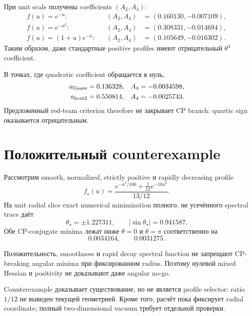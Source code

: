 При unit scale получены coefficients $(A_2,A_4)$:
\begin{align}
 f(u)=e^{-u}:&& (A_2,A_4)&=(0.160130,-0.007109),\\
 f(u)=e^{-u^2}:&& (A_2,A_4)&=(0.308331,-0.014694),\\
 f(u)=(1+u)e^{-u}:&& (A_2,A_4)&=(0.105649,-0.016302).
\end{align}
Таким образом, даже стандартные positive profiles имеют отрицательный
$\theta^4$ coefficient.

В точках, где quadratic coefficient обращается в нуль,
\begin{align}
 a_{\rm Gauss}&=0.136328,
 &A_4&=-0.0034598,\\
 a_{\rm heat2}&=0.550814,
 &A_4&=-0.0025743.
\end{align}
Предложенный red-team criterion therefore не закрывает CP branch: quartic
sign оказывается отрицательным.

\section{Положительный counterexample}

Рассмотрим smooth, normalized, strictly positive и rapidly decreasing profile
\begin{equation}
 f_\star(u)
 =\frac{e^{-u^2/100}+\frac1{12}e^{-10u^2}}{13/12}.
\end{equation}
На unit radial slice exact numerical minimization полного, не усечённого
spectral trace даёт
\begin{equation}
 \theta_\star=\pm1.227311,
 \qquad
 |\sin\theta_\star|=0.941587.
\end{equation}
Обе CP-conjugate minima лежат ниже $\theta=0$ и $\theta=\pi$ соответственно
на
\begin{equation}
 0.0034164,\qquad0.0031275.
\end{equation}

\begin{theorem}
Положительность, smoothness и rapid decay spectral function не запрещают
CP-breaking angular minima при фиксированном radius. Поэтому нулевой mixed
Hessian и positivity не доказывают даже angular no-go.
\end{theorem}

Counterexample доказывает существование, но не является profile selector:
ratio $1/12$ не выведен текущей геометрией. Кроме того, расчёт пока фиксирует
radial coordinate; полный two-dimensional vacuum требует отдельной проверки.

